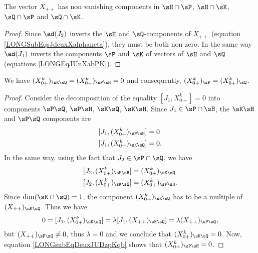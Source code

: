 \begin{corollary}		\label{LONGCorHPHKQPQKXuu}
	The vector $X_{++}$ has non vanishing components in $\sH\cap\sP$, $\sH\cap\sK$, $\sQ\cap\sP$ and $\sQ\cap\sK$.
\end{corollary}

\begin{proof}
	Since $\ad(J_2)$ inverts the $\sH$ and $\sQ$-components of $X_{++}$ (equation \eqref{LONGSubEqsJdeuxXalphaneta}), they must be both non zero. In the same way $\ad(J_1)$ inverts the components $\sP$ and $\sK$ of vectors of $\sH$ and $\sQ$ (equations \eqref{LONGEqJUnXabPK}).
\end{proof}

\begin{lemma}		\label{LONGLEmDesZPP}
	We have	$(X^{k}_{0+})_{\sK\sQ}=(X^{k}_{0+})_{\sP\sH}=0$ and consequently, $(X^k_{0+})_{\sP}=(X^k_{0+})_{\sQ}$.
\end{lemma}

\begin{proof}
	Consider the decomposition of the equality $[J_1,X^{k}_{0+}]=0$ into components $\sP\sQ$, $\sP\sH$, $\sK\sQ$, $\sK\sH$. Since $J_1\in\sP\cap\sH$, the $\sK\sH$ and $\sP\sQ$ components are
	\begin{subequations}
		\begin{align}
			[J_1,(X^{k}_{0+})_{\sP\sH}] & =0  \\
			[J_1,(X^{k}_{0+})_{\sK\sQ}] & =0.
		\end{align}
	\end{subequations}
	In the same way, using the fact that $J_2\in\sP\cap\sQ$, we have
	\begin{subequations}	\label{LONGEqDeuxJUDzpKq}
		\begin{align}
			[J_2,(X_{0+}^{k})_{\sP\sH}] & =(X_{0+}^{k})_{\sK\sQ}                                 \\
			[J_2,(X^{k}_{0+})_{\sK\sQ}] & =(X^{k}_{0+})_{\sP\sH}.		\label{LONGsubEqDeuxJUDzpKqb}
		\end{align}
	\end{subequations}
	Since $\dim(\sK\cap\sQ)=1$, the component $(X^{k}_{0+})_{\sK\sQ}$ has to be a multiple of $(X_{++})_{\sK\sQ}$. Thus we have
	\begin{equation}
		0=[J_1,(X^{k}_{0+})_{\sK\sQ}]=\lambda [J_1,(X_{++})_{\sK\sQ}]=\lambda (X_{++})_{\sP\sQ},
	\end{equation}
	but $(X_{++})_{\sP\sQ}\neq 0$, thus $\lambda=0$ and we conclude that $(X_{0+}^{k})_{\sK\sQ}=0$. Now, equation \eqref{LONGsubEqDeuxJUDzpKqb} shows that $(X_{0+}^{k})_{\sP\sH}=0$.
\end{proof}

